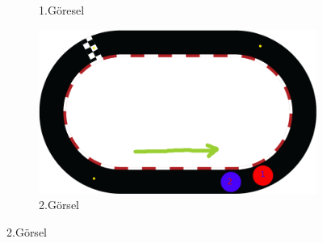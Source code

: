 \documentclass[12pt,a4paper]{article}
\begin{document}
\begin{enumerate}
\begin{figure}[htbp]
\begin{subfigure}[b]{0.45\textwidth}
        \caption{1.Göresel}
        \label{fig:resim1}
    \end{subfigure}
    \hfill
    \begin{subfigure}[b]{0.45\textwidth}
        \centering
        \includegraphics[width=\textwidth]{yarıspisti2.png}
         \caption{2.Görsel}
        \label{fig:resim2}
    \end{subfigure}
    

\end{figure}
\end{enumerate}
\end{document}
